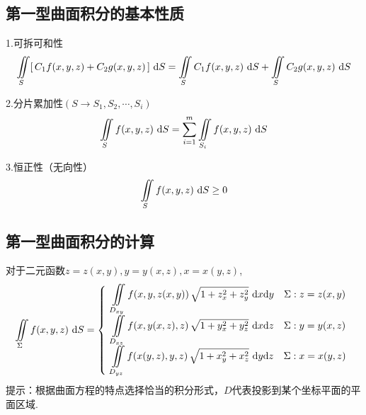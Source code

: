 \subsection{第一型曲面积分的基本性质}
\vspace*{-1em}

\theorem[第一型曲面积分的三个基本性质]
1.可拆可和性
\begin{equation}
	\iint\limits_{S}[\,C_1f(x,y,z)+C_2g(x,y,z)\,]\,\,{\rm{d}} S =\iint\limits_{S}C_1f(x,y,z)\,\,{\rm{d}} S + \iint\limits_{S}C_2g(x,y,z)\,\,{\rm{d}} S
\end{equation}

\par 2.分片累加性$(S\rightarrow S_1,S_2,\cdots,S_i)$
\begin{equation}
	\iint\limits_{S}f(x,y,z)\,\,{\rm{d}} S = \sum_{i=1}^{m}\iint\limits_{S_i}f(x,y,z)\,\,{\rm{d}} S
\end{equation}

\par 3.恒正性（无向性）
\begin{equation}
	\iint\limits_{S}f(x,y,z)\,\,{\rm{d}} S \geq 0
\end{equation}

\subsection{第一型曲面积分的计算}
\vspace*{-1em}

\theorem[二元函数下第一型曲面积分的计算]
对于二元函数$z=z(x,y),y=y(x,z),x=x(y,z)$,
\renewcommand\arraystretch{1.5}
\begin{equation}
	\iint\limits_{\Sigma}f(x,y,z)\,\,{\rm{d}} S 
	=
	\left\lbrace 
	\begin{array}{c}
		\displaystyle \iint\limits_{D_{xy}}f(x,y,z(x,y))\,\sqrt{1+z_x^2+z_y^2}\,\,{\rm{d}} x{\rm{d}} y\quad \Sigma :z=z(x,y) \\
		\displaystyle  \iint\limits_{D_{xz}}f(x,y(x,z),z)\,\sqrt{1+y_x^2+y_z^2}\,\,{\rm{d}} x{\rm{d}} z\quad \Sigma :y=y(x,z) \\
		\displaystyle  \iint\limits_{D_{yz}}f(x(y,z),y,z)\,\sqrt{1+x_y^2+x_z^2}\,\,{\rm{d}} y{\rm{d}} z\quad \Sigma :x=x(y,z)
	\end{array}
	\right.
\end{equation}
\renewcommand\arraystretch{1}
提示：根据曲面方程的特点选择恰当的积分形式，$D$代表投影到某个坐标平面的平面区域.

